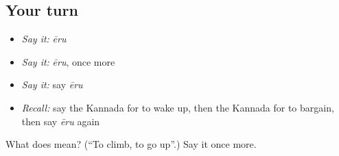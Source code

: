 \subsection*{Your turn}
\begin{itemize}
\raggedright
  \item \emph{Say it:} \emph{ēru}
  \item \emph{Say it:} \emph{ēru}, once more
  \item \emph{Say it:} say \emph{ēru}
  \item \emph{Recall:} say the Kannada for to wake up, then the Kannada for to bargain, then say \emph{ēru} again
\end{itemize}

\begin{tcolorbox}[breakable,colback=teal!4,colframe=teal!35!black,title={Before you move on}]
What does  mean? (\textquotedblleft{}To climb, to go up\textquotedblright{}.) Say it once more.
\end{tcolorbox}
